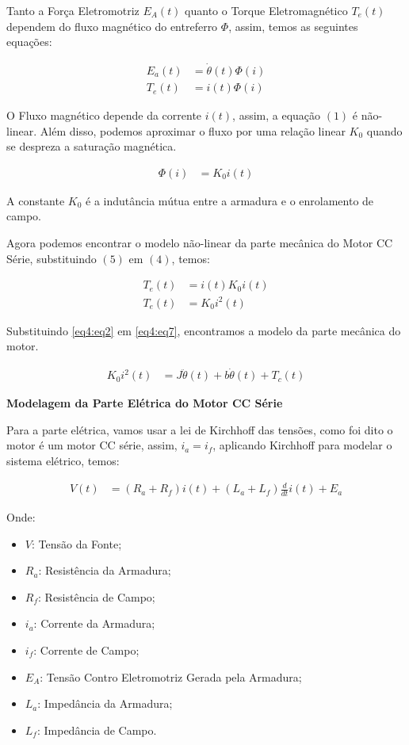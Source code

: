 Tanto a Força Eletromotriz $E_A(t)$ quanto o Torque Eletromagnético $T_e(t)$ dependem do fluxo magnético do entreferro $\Phi$, assim, temos as seguintes equações:

\begin{align}
	E_a(t) &= \dot{\theta}(t) \Phi{(i)} \label{eq4:eq3}\\
	T_e(t) &= i(t) \Phi{(i)}			\label{eq4:eq4}
\end{align}

O Fluxo magnético depende da corrente $i(t)$, assim, a equação $(1)$ é não-linear. Além disso, podemos aproximar o fluxo por uma relação linear $K_0$ quando se despreza a saturação magnética.

\begin{align}
	\Phi(i) &= K_0 i(t) \label{eq4:eq5}
\end{align}

A constante $K_0$ é a indutância mútua entre a armadura e o enrolamento de campo.

Agora podemos encontrar o modelo não-linear da parte mecânica do Motor CC Série, substituindo $(5)$ em $(4)$, temos:

\begin{align}
	T_e(t) &= i(t) K_0 i(t) \label{eq4:eq6}\\
	T_e(t) &= K_0 i^2(t) 	\label{eq4:eq7}
\end{align}

Substituindo \ref{eq4:eq2} em \ref{eq4:eq7}, encontramos a modelo da parte mecânica do motor.


\begin{align}
	K_0 i^2(t) &= J\ddot{\theta}(t) + b\dot{\theta}(t) + T_c(t) \label{eq4:eq8}
\end{align}

\noindent \textbf{Modelagem da Parte Elétrica do Motor CC Série}

Para a parte elétrica, vamos usar a lei de Kirchhoff das tensões, como foi dito o motor é um motor CC série, assim, $i_a = i_f$, aplicando Kirchhoff para modelar o sistema elétrico, temos:


\begin{align}
	V(t) &= (R_a + R_f)i(t)+ (L_a + L_f)\frac{d}{dt}i(t) + E_a \label{eq4:eq9}
\end{align}

Onde:

\begin{itemize}
	\item $V$: Tensão da Fonte;
	\item $R_a$: Resistência da Armadura;
	\item $R_f$: Resistência de Campo;
	\item $i_a$: Corrente da Armadura;
	\item $i_f$: Corrente de Campo;
	\item $E_A$: Tensão Contro Eletromotriz Gerada pela Armadura;
	\item $L_a$: Impedância da Armadura;
	\item $L_f$: Impedância de Campo.
\end{itemize}

